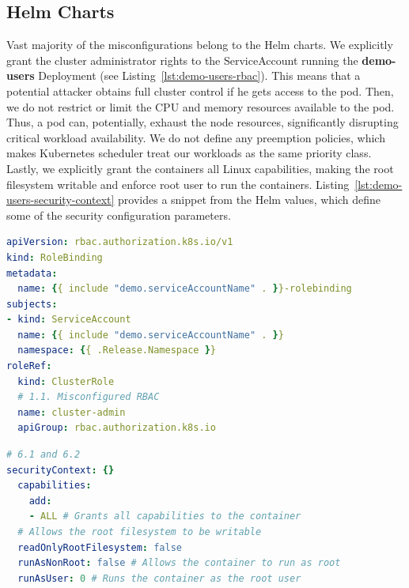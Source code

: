 \subsection{Helm Charts}

Vast majority of the misconfigurations belong to the Helm charts. We explicitly grant the cluster administrator rights to the ServiceAccount running the \textbf{demo-users} Deployment (see Listing~\ref{lst:demo-users-rbac}). This means that a potential attacker obtains full cluster control if he gets access to the pod. Then, we do not restrict or limit the CPU and memory resources available to the pod. Thus, a pod can, potentially, exhaust the node resources, significantly disrupting critical workload availability. We do not define any preemption policies, which makes Kubernetes scheduler treat our workloads as the same priority class. Lastly, we explicitly grant the containers all Linux capabilities, making the root filesystem writable and enforce root user to run the containers. Listing~\ref{lst:demo-users-security-context} provides a snippet from the Helm values, which define some of the security configuration parameters.

\begin{lstlisting}[language=YAML, caption={[RoleBinding definition for demo-users ServiceAccount] RoleBinding definition for \textbf{demo-users} ServiceAccount, granting it cluster administrator rights.}, label={lst:demo-users-rbac}]
apiVersion: rbac.authorization.k8s.io/v1
kind: RoleBinding
metadata:
  name: {{ include "demo.serviceAccountName" . }}-rolebinding
subjects:
- kind: ServiceAccount
  name: {{ include "demo.serviceAccountName" . }}
  namespace: {{ .Release.Namespace }}
roleRef:
  kind: ClusterRole
  # 1.1. Misconfigured RBAC
  name: cluster-admin
  apiGroup: rbac.authorization.k8s.io
\end{lstlisting}

\begin{lstlisting}[language=YAML, caption={[Demo-users Helm Chart values snippet] \textbf{demo-users} Helm Chart values snippet, granting the container unnecessary permissions.}, label={lst:demo-users-security-context}]
# 6.1 and 6.2
securityContext: {}
  capabilities:
    add:
    - ALL # Grants all capabilities to the container
  # Allows the root filesystem to be writable
  readOnlyRootFilesystem: false 
  runAsNonRoot: false # Allows the container to run as root
  runAsUser: 0 # Runs the container as the root user
\end{lstlisting}
